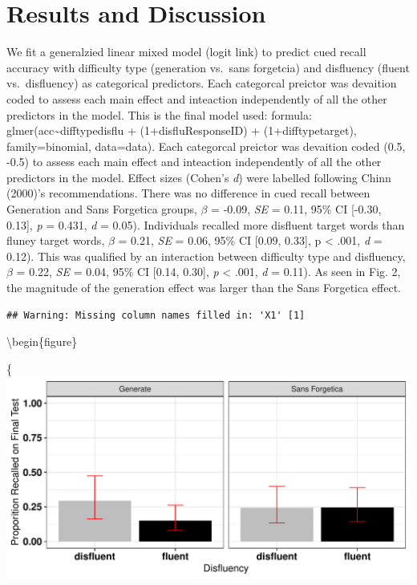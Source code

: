 \documentclass[english,pdf]{apa6}
\begin{document}
\hypertarget{results-and-discussion}{%
\section{Results and Discussion}\label{results-and-discussion}}

We fit a generalzied linear mixed model (logit link) to predict cued recall accuracy with difficulty type (generation vs.~sans forgetcia) and disfluency (fluent vs.~disfluency) as categorical predictors. Each categorcal preictor was devaition coded to assess each main effect and inteaction independently of all the other predictors in the model. This is the final model used: formula: glmer(acc\textasciitilde{}difftypedisflu + (1+disflu\textbar{}ResponseID) + (1+difftype\textbar{}target), family=binomial, data=data). Each categorcal preictor was devaition coded (0.5, -0.5) to assess each main effect and inteaction independently of all the other predictors in the model. Effect sizes (Cohen's \emph{d}) were labelled following Chinn (2000)'s recommendations. There was no difference in cued recall between Generation and Sans Forgetica groups, \(\beta\) = -0.09, \emph{SE} = 0.11, 95\% CI {[}-0.30, 0.13{]}, \emph{p} = 0.431, \emph{d} = 0.05). Individuals recalled more disfluent target words than fluney target words, \(\beta\) = 0.21, \emph{SE} = 0.06, 95\% CI {[}0.09, 0.33{]}, p \textless{} .001, \emph{d} = 0.12). This was qualified by an interaction between difficulty type and disfluency, \(\beta\) = 0.22, \emph{SE} = 0.04, 95\% CI {[}0.14, 0.30{]}, \emph{p} \textless{} .001, \emph{d} = 0.11). As seen in Fig. 2, the magnitude of the generation effect was larger than the Sans Forgetica effect.

\begin{verbatim}
## Warning: Missing column names filled in: 'X1' [1]
\end{verbatim}

\textbackslash{}begin\{figure\}

\{\centering \includegraphics{SF_Paper_files/figure-latex/unnamed-chunk-2-1}
\end{document}
